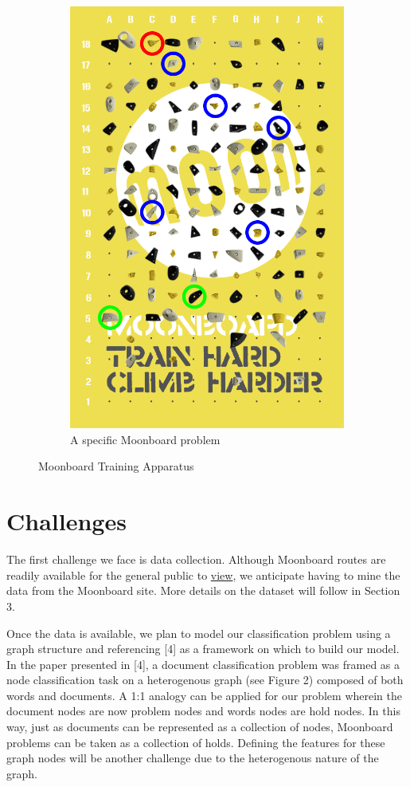 \documentclass{article}
\begin{document}
\begin{figure}
\begin{subfigure}{.48\textwidth}
  \includegraphics[width=.8\linewidth]{moonboard_1}
  \caption{A specific Moonboard problem}
  \label{fig: Moonboard Problem}
\end{subfigure}
\caption{Moonboard Training Apparatus}
\end{figure}

\section{Challenges}
The first challenge we face is data collection. Although Moonboard routes are readily available for the general public to \href{https://moonboard.com/}{view}, we anticipate having to mine the data from the Moonboard site. More details on the dataset will follow in Section 3. 

Once the data is available, we plan to model our classification problem using a graph structure and referencing [4] as a framework on which to build our model. In the paper presented in [4], a document classification problem was framed as a node classification task on a heterogenous graph (see Figure 2) composed of both words and documents. A 1:1 analogy can be applied for our problem wherein the document nodes are now problem nodes and words nodes are hold nodes. In this way, just as documents can be represented as a collection of nodes, Moonboard problems can be taken as a collection of holds. Defining the features for these graph nodes will be another challenge due to the heterogenous nature of the graph.
\end{document}
